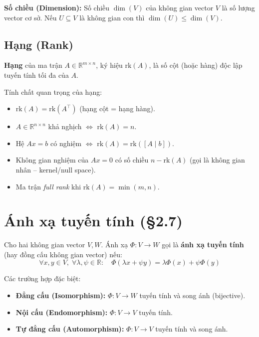 \documentclass[12pt,a4paper]{article}
\begin{document}
\begin{dinhnghia}
\textbf{Số chiều (Dimension):} Số chiều $\dim(V)$ của không gian vector $V$ là số lượng vector cơ sở. Nếu $U \subseteq V$ là không gian con thì $\dim(U) \le \dim(V)$.
\end{dinhnghia}

\subsection{Hạng (Rank)}

\begin{dinhnghia}
\textbf{Hạng} của ma trận $A \in \mathbb{R}^{m \times n}$, ký hiệu $\mathrm{rk}(A)$, là số cột (hoặc hàng) độc lập tuyến tính tối đa của $A$.
\end{dinhnghia}

\begin{dinhly}
Tính chất quan trọng của hạng:
\begin{itemize}
  \item $\mathrm{rk}(A) = \mathrm{rk}(A^\top)$ (hạng cột = hạng hàng).
  \item $A \in \mathbb{R}^{n \times n}$ khả nghịch $\Leftrightarrow$ $\mathrm{rk}(A) = n$.
  \item Hệ $Ax = b$ có nghiệm $\Leftrightarrow$ $\mathrm{rk}(A) = \mathrm{rk}([A \mid b])$.
  \item Không gian nghiệm của $Ax = 0$ có số chiều $n - \mathrm{rk}(A)$ (gọi là không gian nhân -- kernel/null space).
  \item Ma trận \emph{full rank} khi $\mathrm{rk}(A) = \min(m, n)$.
\end{itemize}
\end{dinhly}

\section{Ánh xạ tuyến tính (§2.7)}

\begin{dinhnghia}
Cho hai không gian vector $V, W$. Ánh xạ $\Phi : V \to W$ gọi là \textbf{ánh xạ tuyến tính} (hay đồng cấu không gian vector) nếu:
\[
  \forall x, y \in V,\; \forall \lambda, \psi \in \mathbb{R}:\quad \Phi(\lambda x + \psi y) = \lambda\Phi(x) + \psi\Phi(y)
\]
\end{dinhnghia}

Các trường hợp đặc biệt:
\begin{itemize}
  \item \textbf{Đẳng cấu (Isomorphism):} $\Phi : V \to W$ tuyến tính và song ánh (bijective).
  \item \textbf{Nội cấu (Endomorphism):} $\Phi : V \to V$ tuyến tính.
  \item \textbf{Tự đẳng cấu (Automorphism):} $\Phi : V \to V$ tuyến tính và song ánh.
\end{itemize}
\end{document}
